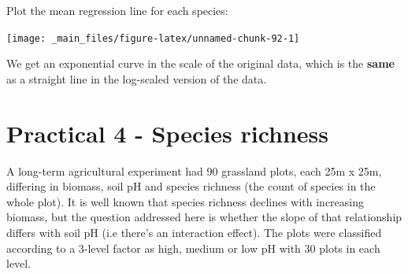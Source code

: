 \documentclass[]{book}
\newenvironment{Shaded}{\begin{snugshade}}{\end{snugshade}}
\newcommand{\KeywordTok}[1]{\textcolor[rgb]{0.13,0.29,0.53}{\textbf{#1}}}
\newcommand{\DataTypeTok}[1]{\textcolor[rgb]{0.13,0.29,0.53}{#1}}
\newcommand{\DecValTok}[1]{\textcolor[rgb]{0.00,0.00,0.81}{#1}}
\newcommand{\StringTok}[1]{\textcolor[rgb]{0.31,0.60,0.02}{#1}}
\newcommand{\OperatorTok}[1]{\textcolor[rgb]{0.81,0.36,0.00}{\textbf{#1}}}
\newcommand{\NormalTok}[1]{#1}
\theoremstyle{definition}
\theoremstyle{definition}
\theoremstyle{definition}
\theoremstyle{remark}
\begin{document}
Plot the mean regression line for each species:

\begin{Shaded}
\end{Shaded}

\begin{center}\texttt{[image: \_main\_files/figure-latex/unnamed-chunk-92-1]} \end{center}

We get an exponential curve in the scale of the original data, which is
the \textbf{same} as a straight line in the log-scaled version of the
data.

\section{Practical 4 - Species
richness}\label{practical-4---species-richness}

A long-term agricultural experiment had 90 grassland plots, each 25m x
25m, differing in biomass, soil pH and species richness (the count of
species in the whole plot). It is well known that species richness
declines with increasing biomass, but the question addressed here is
whether the slope of that relationship differs with soil pH (i.e there's
an interaction effect). The plots were classified according to a 3-level
factor as high, medium or low pH with 30 plots in each level.
\end{document}
